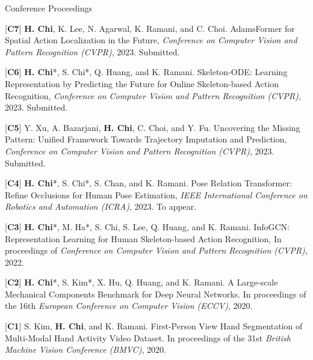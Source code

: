 


\begin{cventries}
\cvpub
{Conference Proceedings} %
{ %
\begin{cvitems}
\item {[\textbf{C7}] \textbf{H. Chi}, K. Lee, N. Agarwal, K. Ramani, and C. Choi. AdamsFormer for Spatial Action Localization in the Future, \textit{Conference on Computer Vision and Pattern Recognition (CVPR)}, 2023. Submitted.}
\item {[\textbf{C6}] \textbf{H. Chi}*, S. Chi*, Q. Huang, and K. Ramani. Skeleton-ODE: Learning Representation by Predicting the Future for Online Skeleton-based Action Recognition, \textit{Conference on Computer Vision and Pattern Recognition (CVPR)}, 2023. Submitted.}
\item {[\textbf{C5}] Y. Xu, A. Bazarjani, \textbf{H. Chi}, C. Choi, and Y. Fu. Uncovering the Missing Pattern: Unified Framework Towards Trajectory Imputation and Prediction, \textit{Conference on Computer Vision and Pattern Recognition (CVPR)}, 2023. Submitted.}
\item {[\textbf{C4}] \textbf{H. Chi}*, S. Chi*, S. Chan, and K. Ramani. Pose Relation Transformer: Refine Occlusions for Human Pose Estimation, \textit{IEEE International Conference on Robotics and Automation (ICRA)}, 2023. To appear.}
\item {[\textbf{C3}] \textbf{H. Chi}*, M. Ha*, S. Chi, S. Lee, Q. Huang, and K. Ramani. InfoGCN: Representation Learning for Human Skeleton-based Action Recognition, In proceedings of \textit{Conference on Computer Vision and Pattern Recognition (CVPR)}, 2022.}
\item {[\textbf{C2}] \textbf{H. Chi}*, S. Kim*, X. Hu, Q. Huang, and K. Ramani. A Large-scale Mechanical Components Benchmark for Deep Neural Networks. In proceedings of the 16th \textit{European Conference on Computer Vision (ECCV)}, 2020.}
\item {[\textbf{C1}] S. Kim, \textbf{H. Chi}, and K. Ramani. First-Person View Hand Segmentation of Multi-Modal Hand Activity Video Dataset. In proceedings of the 31st \textit{British Machine Vision Conference (BMVC)}, 2020.}
\end{cvitems}
}


\end{cventries}
